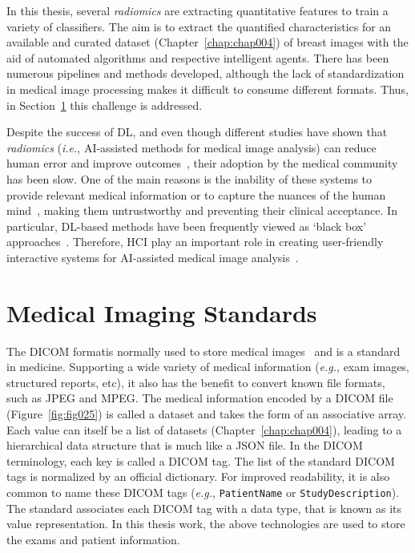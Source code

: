 In this thesis, several {\it radiomics} are extracting quantitative features to train a variety of classifiers.
The aim is to extract the quantified characteristics for an available and curated dataset (Chapter~\ref{chap:chap004}) of breast images with the aid of automated algorithms and respective intelligent agents.
There has been numerous pipelines and methods developed, although the lack of standardization in medical image processing makes it difficult to consume different formats.
Thus, in Section~\ref{sec:sec002007} this challenge is addressed.

Despite the success of \ac{DL}, and even though different studies have shown that {\it radiomics} ({\it i.e.}, \ac{AI}-assisted methods for medical image analysis) can reduce human error and improve outcomes~\cite{Cai:2019:HTC:3290605.3300234, delvaux2017effects, middleton2016clinical}, their adoption by the medical community has been slow.
One of the main reasons is the inability of these systems to provide relevant medical information or to capture the nuances of the human mind~\cite{khairat2018reasons, kohli2018cad, 10.1145/2858036.2858373}, making them untrustworthy and preventing their clinical acceptance.
In particular, \ac{DL}-based methods have been frequently viewed as `black box' approaches~\cite{litjens2017survey}.
Therefore, \ac{HCI} play an important role in creating user-friendly interactive systems for \ac{AI}-assisted medical image analysis~\cite{10.1145/3132272.3134111}.

\section{Medical Imaging Standards}
\label{sec:sec002007}

The \ac{DICOM} format\footnotemark[7] is normally used to store medical images~\cite{Trivedi2019} and is a standard in medicine.
Supporting a wide variety of medical information ({\it e.g.}, exam images, structured reports, etc), it also has the benefit to convert known file formats, such as \ac{JPEG} and \ac{MPEG}.
The medical information encoded by a \ac{DICOM} file (Figure~\ref{fig:fig025}) is called a dataset and takes the form of an associative array.
Each value can itself be a list of datasets (Chapter~\ref{chap:chap004}), leading to a hierarchical data structure that is much like a \ac{JSON} file.
In the \ac{DICOM} terminology, each key is called a \ac{DICOM} tag.
The list of the standard \ac{DICOM} tags is normalized by an official dictionary.
For improved readability, it is also common to name these \ac{DICOM} tags ({\it e.g.}, \texttt{PatientName} or \texttt{StudyDescription}).
The standard associates each \ac{DICOM} tag with a data type, that is known as its value representation.
In this thesis work, the above technologies are used to store the exams and patient information.

